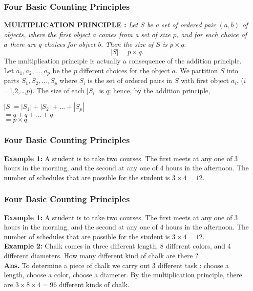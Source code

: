 \documentclass{beamer}
\begin{document}
 \section{}
 \begin{frame}
\frametitle{Four Basic Counting Principles}

 {\Large \bf MULTIPLICATION PRINCIPLE :} 
  {\it Let $S$ be a set of ordered pair $ (a,b) $ of objects, where the first object $a$ comes from a set of size $p$, and for each choice of $a$ there are $q$ choices for object $b$. Then the size of $S$ is  $ p\times q:$}\\$$|S|= p \times q.$$
   The multiplication principle is actually a consequence of the addition principle. Let $a_1,a_2,\dots,a_p$ be the $p$ different choices for the object $a$. We partition $S$ into parts $S_1,S_2
  ,\dots,S_p$ where $S_i$ is the set of ordered pairs in $S$ with first object $a_i$, ($i$=1,2,\dots,$p$). The size of each $|S_i|$ is $q$; hence, by the addition principle,
  \begin{center}
  $|S|=|S_1|+|S_2|+\dots+|S_p|$\\
$=q+q+\dots+q$\\
     $ =p\times q$
   \end{center} 
   \end{frame}
\begin{frame}
\frametitle{Four Basic Counting Principles}
  {\bf Example 1: }A student is to take two courses. The first meets at any one of 3 hours in the morning, and the second at any one of 4 hours in the afternoon. The number of schedules that are possible for the student is $ 3 \times 4 = 12 $.\\
  \end{frame}   
   
   
   
\begin{frame}
\frametitle{Four Basic Counting Principles }
  {\bf Example 1: }A student is to take two courses. The first meets at any one of 3 hours in the morning, and the second at any one of 4 hours in the afternoon. The number of schedules that are possible for the student is $ 3 \times 4 = 12 $.\\
  
  {\bf Example 2: }Chalk comes in three different length, 8 different colors, and 4 different diameters. How many different kind of chalk are there ?\\
{\bf Ans. }To determine a piece of chalk we carry out 3 different task : choose a length, choose a color, choose a diameter. By the multiplication principle, there are  $   3\times8\times4 = 96 $ different kinds of chalk.
\end{frame}
\end{document}
